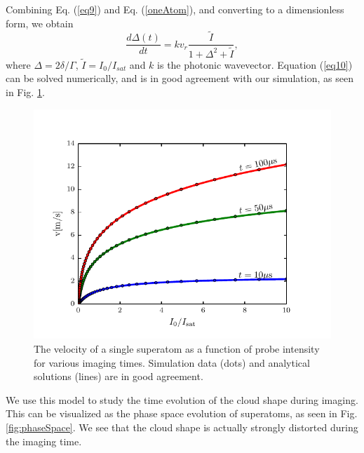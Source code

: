 \documentclass[12pt]{iopart}
\begin{document}
Combining Eq. (\ref{eq9}) and Eq. (\ref{oneAtom}), and converting to a dimensionless form, we obtain
\begin{equation}
\frac{d\Delta(t)}{dt}= k v_r \frac{\tilde{I}}{1+\Delta^2+\tilde{I}},
\label{eq10}
\end{equation}
where $\Delta = 2\delta/\Gamma$, $\tilde{I} = I_0/I_{sat}$ and $k$ is the photonic wavevector. Equation (\ref{eq10}) can be solved numerically, and is in good agreement with our simulation, as seen in Fig. \ref{fig:oneAtomVel}.
\begin{figure}
	\includegraphics{figure5.pdf}
\caption{The velocity of a single superatom as a function of probe intensity for various imaging times. Simulation data (dots) and analytical solutions (lines) are in good agreement.}  
\label{fig:oneAtomVel}
\end{figure}
\par We use this model to study the time evolution of the cloud shape during imaging. This can be visualized as the phase space evolution of superatoms, as seen in Fig. \ref{fig:phaseSpace}. We see that the cloud shape is actually strongly distorted during the imaging time. 
\end{document}
